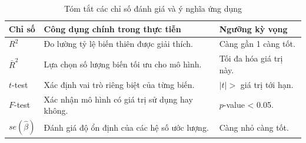 \vspace{0.5cm}
\begin{table}[h]
\centering
\caption{Tóm tắt các chỉ số đánh giá và ý nghĩa ứng dụng}
\begin{tabular}{l p{6cm} l}
\toprule
\textbf{Chỉ số} & \textbf{Công dụng chính trong thực tiễn} & \textbf{Ngưỡng kỳ vọng} \\ \midrule
$R^2$ & Đo lường tỷ lệ biến thiên được giải thích. & Càng gần 1 càng tốt. \\
$\bar{R}^2$ & Lựa chọn số lượng biến tối ưu cho mô hình. & Tối đa hóa giá trị này. \\
$t$-test & Xác định vai trò riêng biệt của từng biến. & $|t| >$ giá trị tới hạn. \\
$F$-test & Xác nhận mô hình có giá trị sử dụng hay không. & $p$-value < 0.05. \\
$se(\hat{\beta})$ & Đánh giá độ ổn định của các hệ số ước lượng. & Càng nhỏ càng tốt. \\ \bottomrule
\end{tabular}
\end{table}
